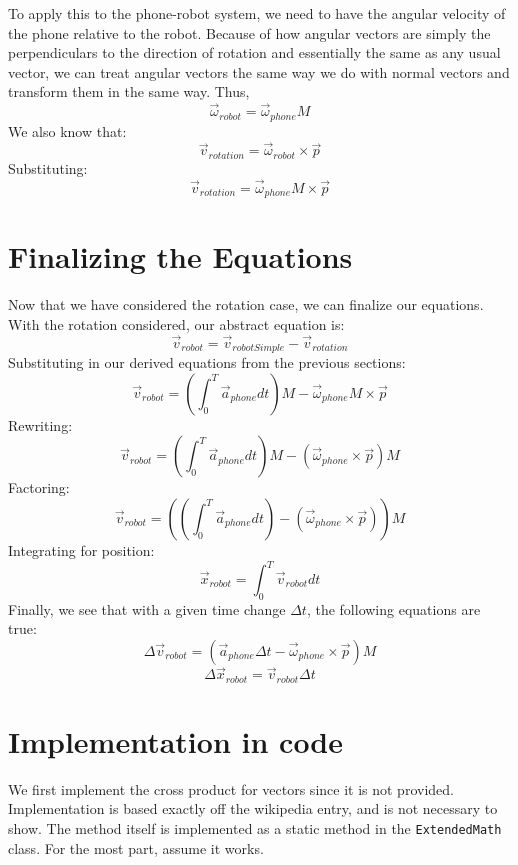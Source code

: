 \documentclass{article}
\begin{document}
To apply this to the phone-robot system, we need to have the angular velocity of the phone relative to the robot. Because of how angular vectors are simply the perpendiculars to the direction of rotation and essentially the same as any usual vector, we can treat angular vectors the same way we do with normal vectors and transform them in the same way. Thus,
\[
    \vec{\omega}_{robot} = \vec{\omega}_{phone} M
\]
We also know that:
\[
    \vec{v}_{rotation} = \vec{\omega}_{robot} \times \vec{p}
\]
Substituting:
\[
    \vec{v}_{rotation} = \vec{\omega}_{phone} M \times \vec{p}
\]

\section{Finalizing the Equations}
Now that we have considered the rotation case, we can finalize our equations. With the rotation considered, our abstract equation is:
\[
    \vec{v}_{robot} = \vec{v}_{robotSimple} - \vec{v}_{rotation}
\]
Substituting in our derived equations from the previous sections:
\[
    \vec{v}_{robot} = (\int_{0}^{T} \vec{a}_{phone} dt) M -
    \vec{\omega}_{phone} M \times \vec{p}
\]
Rewriting:
\[
    \vec{v}_{robot} = (\int_{0}^{T} \vec{a}_{phone} dt) M -
    (\vec{\omega}_{phone} \times \vec{p}) M
\]
Factoring:
\[
    \vec{v}_{robot} = ((\int_{0}^{T} \vec{a}_{phone} dt) -
    (\vec{\omega}_{phone} \times \vec{p})) M
\]
Integrating for position:
\[
    \vec{x}_{robot} = \int_{0}^{T} \vec{v}_{robot} dt
\]
Finally, we see that with a given time change $\Delta t$, the following equations are true:
\[
    \Delta \vec{v}_{robot} = (
        \vec{a}_{phone} \Delta t -
        \vec{\omega}_{phone} \times \vec{p}
        ) M
\]
\[
    \Delta \vec{x}_{robot} = \vec{v}_{robot} \Delta t
\]
\clearpage
\section{Implementation in code}
We first implement the cross product for vectors since it is not provided. Implementation is based exactly off the wikipedia entry, and is not necessary to show. The method itself is implemented as a static method in the \verb|ExtendedMath| class. For the most part, assume it works.
\end{document}
